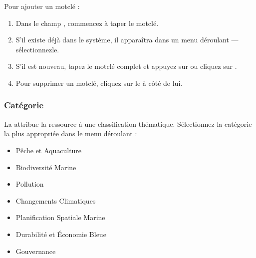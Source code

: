 \documentclass[letterpaper,10pt,english]{sphinxmanual}
\begin{document}
\sphinxAtStartPar
Pour ajouter un mot\sphinxhyphen{}clé :
\begin{enumerate}
%
\item {} 
\sphinxAtStartPar
Dans le champ , commencez à taper le mot\sphinxhyphen{}clé.

\item {} 
\sphinxAtStartPar
S’il existe déjà dans le système, il apparaîtra dans un menu déroulant — sélectionnez\sphinxhyphen{}le.

\item {} 
\sphinxAtStartPar
S’il est nouveau, tapez le mot\sphinxhyphen{}clé complet et appuyez sur  ou cliquez
sur .

\item {} 
\sphinxAtStartPar
Pour supprimer un mot\sphinxhyphen{}clé, cliquez sur le  à côté de lui.

\end{enumerate}


\subsubsection{Catégorie}
\label{\detokenize{fr/03_gerer_metadonnees:categorie}}
\sphinxAtStartPar
La  attribue la ressource à une classification thématique. Sélectionnez
la catégorie la plus appropriée dans le menu déroulant :
\begin{itemize}
\item {} 
\sphinxAtStartPar
Pêche et Aquaculture

\item {} 
\sphinxAtStartPar
Biodiversité Marine

\item {} 
\sphinxAtStartPar
Pollution

\item {} 
\sphinxAtStartPar
Changements Climatiques

\item {} 
\sphinxAtStartPar
Planification Spatiale Marine

\item {} 
\sphinxAtStartPar
Durabilité et Économie Bleue

\item {} 
\sphinxAtStartPar
Gouvernance

\end{itemize}
\end{document}
